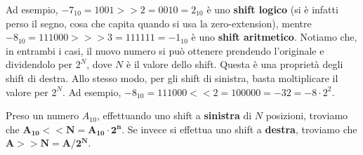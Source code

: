 \documentclass[11pt, a4paper, titlepage, oneside]{scrbook}
\begin{document}
Ad esempio, $-7_{10} = 1001 \bm{>>} 2 = 0010 = 2_{10}$ è uno \textbf{shift logico} (si è infatti perso il segno, cosa che capita quando si usa la zero-extension), mentre $-8_{10} = 111000 \bm{>>>} 3 = 111111 = -1_{10}$ è uno \textbf{shift aritmetico}. Notiamo che, in entrambi i casi, il nuovo numero si può ottenere prendendo l'originale e dividendolo per $2^N$, dove $N$ è il valore dello shift. Questa è una proprietà degli shift di destra. Allo stesso modo, per gli shift di sinistra, basta moltiplicare il valore per $2^N$. Ad esempio, $-8_{10} = 111000 << 2 = 100000 = -32 = -8 \cdot 2^2$.  

\begin{Proposizione}
\label{propos-caloclare-decimale-post-shift}
Preso un numero $A_{10}$, effettuando uno shift a \textbf{sinistra} di $N$ posizioni, troviamo che $\bm{A_{10} << N = A_{10} \cdot 2^n}$. Se invece si effettua uno shift a \textbf{destra}, troviamo che $\bm{A >> N = A / 2^N}$.  
\end{Proposizione}
\end{document}
